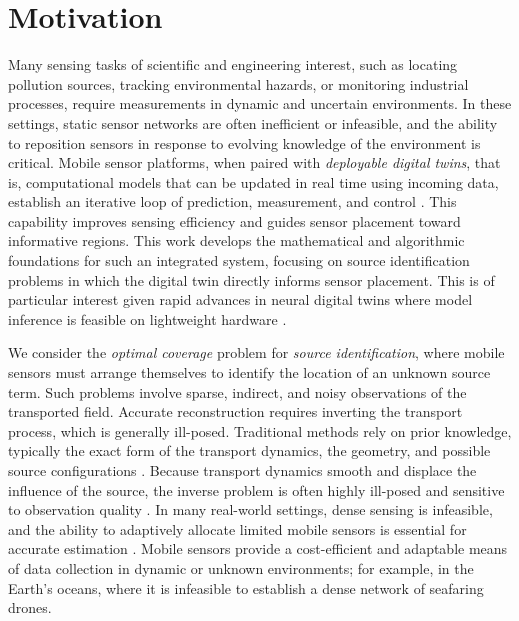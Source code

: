 \documentclass[onefignum,onetabnum]{siamart171218} %
\begin{document}
\section{Motivation}
\label{sec:intro}

Many sensing tasks of scientific and engineering interest, such as locating pollution sources, tracking environmental hazards, or monitoring industrial processes, require measurements in dynamic and uncertain environments. In these settings, static sensor networks are often inefficient or infeasible, and the ability to reposition sensors in response to evolving knowledge of the environment is critical. Mobile sensor platforms, when paired with \emph{deployable digital twins}, that is, computational models that can be updated in real time using incoming data, establish an iterative loop of prediction, measurement, and control \cite{willcox2023foundational}. This capability improves sensing efficiency and guides sensor placement toward informative regions. This work develops the mathematical and algorithmic foundations for such an integrated system, focusing on source identification problems in which the digital twin directly informs sensor placement. This is of particular interest given rapid advances in neural digital twins where model inference is feasible on lightweight hardware \cite{kinch2025structure}.

We consider the \emph{optimal coverage} problem for \emph{source identification}, where mobile sensors must arrange themselves to identify the location of an unknown source term. Such problems involve sparse, indirect, and noisy observations of the transported field. Accurate reconstruction requires inverting the transport process, which is generally ill-posed. Traditional methods rely on prior knowledge, typically the exact form of the transport dynamics, the geometry, and possible source configurations \cite{bal2007inverse}. Because transport dynamics smooth and displace the influence of the source, the inverse problem is often highly ill-posed and sensitive to observation quality \cite{isakov1990inverse}. In many real-world settings, dense sensing is infeasible, and the ability to adaptively allocate limited mobile sensors is essential for accurate estimation \cite{khodayi2019model, luo2019distributed}. Mobile sensors provide a cost-efficient and adaptable means of data collection in dynamic or unknown environments; for example, in the Earth’s oceans, where it is infeasible to establish a dense network of seafaring drones.
\end{document}
